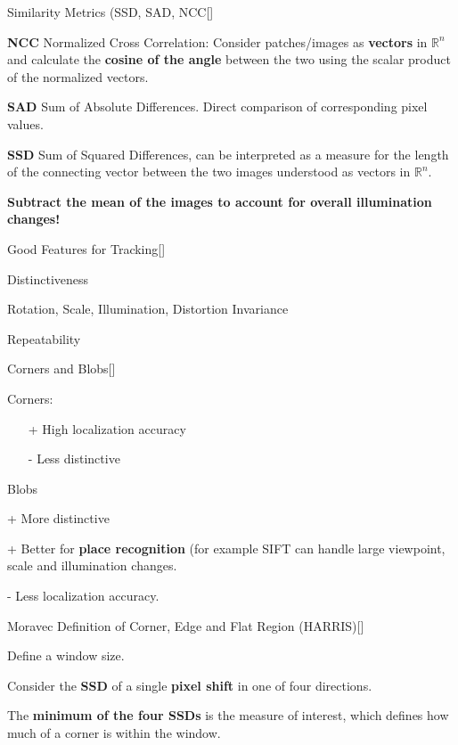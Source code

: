 \documentclass[10pt,a4paper]{scrartcl}
\begin{document}
\begin{multicols*}{2}
\begin{QandA}{Similarity Metrics (SSD, SAD, NCC}[\Definition]
\item \textbf{NCC} Normalized Cross Correlation: Consider patches/images as \textbf{vectors} in $\mathbb{R}^n$ and calculate the \textbf{cosine of the angle} between the two using the scalar product of the normalized vectors.
\item \textbf{SAD} Sum of Absolute Differences. Direct comparison of corresponding pixel values.
\item \textbf{SSD} Sum of Squared Differences, can be interpreted as a measure for the length of the connecting vector between the two images understood as vectors in $\mathbb{R}^n$.
\item \textbf{Subtract the mean of the images to account for overall illumination changes!}
\end{QandA}

\begin{QandA}{Good Features for Tracking}[\Definition]
\item Distinctiveness
\item Rotation, Scale, Illumination, Distortion Invariance
\item Repeatability
\end{QandA}

\begin{QandA}{Corners and Blobs}[\Comparison]
\item Corners:
\begin{itemize}
\item[+] High localization accuracy
\item[-] Less distinctive
\end{itemize}
\item Blobs
\item[+] More distinctive
\item[+] Better for \textbf{place recognition} (for example SIFT can handle large viewpoint, scale and illumination changes.
\item[-] Less localization accuracy.
\end{QandA}

\begin{QandA}{Moravec Definition of Corner, Edge and Flat Region (HARRIS)}[\Derivation]
\item Define a window size.
\item Consider the \textbf{SSD} of a single \textbf{pixel shift} in one of four directions.
\item The \textbf{minimum of the four SSDs} is the measure of interest, which defines how much of a corner is within the window.
\end{QandA}


\end{multicols*}
\end{document}
